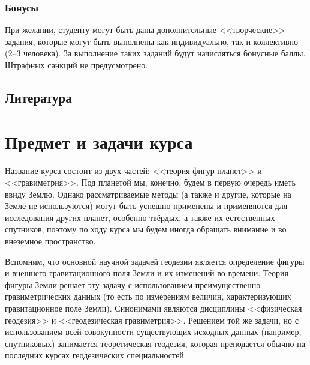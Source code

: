 \documentclass[11pt, a4paper]{article}
\theoremstyle{plain}
\theoremstyle{definition}
\theoremstyle{remark}
\begin{document}
\subsubsection{Бонусы}

При желании, студенту могут быть даны дополнительные <<творческие>> задания, которые могут быть
выполнены как индивидуально, так и коллективно (2--3 человека). За выполнение таких заданий будут
начисляться бонусные баллы. Штрафных санкций не предусмотрено.

\subsection{Литература}
\begin{refsection}
    \nocite{Shimbirev1975, Ogorodova2013, Yuzefovich2014}
    \printbibliography[title={\normalsize Рекомендуемая литература}]
\end{refsection}
\begin{refsection}
    \nocite{Yuzefovich1980, Torge1999, Ogorodova2006, Pellinen1978, Moritz2007, Moritz1983, Ogorodova2011}
    \printbibliography[title={\normalsize Дополнительная литература}]
\end{refsection}

\section{Предмет и задачи курса}

Название курса состоит из двух частей: <<теория фигур планет>> и <<гравиметрия>>. Под планетой мы,
конечно, будем в первую очередь иметь ввиду Землю. Однако рассматриваемые методы (а также и другие,
которые на Земле не используются) могут быть успешно
применены и применяются для исследования других планет, особенно твёрдых, а также их естественных спутников,
поэтому по ходу курса мы будем иногда обращать внимание и во внеземное пространство.

Вспомним, что основной научной задачей геодезии является определение фигуры и внешнего
гравитационного поля Земли и их изменений во времени. Теория фигуры Земли решает эту задачу с
использованием преимущественно гравиметрических данных (то есть по измерениям величин,
характеризующих гравитационное поле Земли). Синонимами
являются дисциплины <<физическая геодезия>> и <<геодезическая гравиметрия>>. Решением той же задачи,
но с использованием всей совокупности существующих исходных данных (например, спутниковых)
занимается теоретическая геодезия, которая преподается обычно на последних курсах геодезических
специальностей. 
\end{document}
